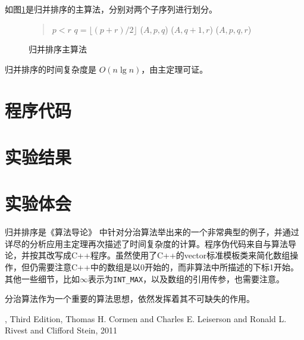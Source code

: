 \documentclass[cs4size,a4paper,nofonts]{ctexart}
\begin{document}
如图\ref{Merge-Sort}是归并排序的主算法，分别对两个子序列进行划分。

\begin{figure}[htp]
\begin{quote}
\begin{codebox}
\li \If $p < r$ \Then
\li   $q = \lfloor (p + r) / 2 \rfloor$
\li   {}($A, p, q$)
\li   {}($A, q + 1, r$)
\li   {}($A, p, q, r$)
    \End
\end{codebox}
\end{quote}
\caption{\label{Merge-Sort}归并排序主算法}
\end{figure}

归并排序的时间复杂度是 $O(n\lg n)$，由主定理可证。

\section{程序代码}
{\linespread{1}}

\section{实验结果}
\begin{quote}

\end{quote}

\section{实验体会}

归并排序是《算法导论》\cite{clrs} 中针对分治算法举出来的一个非常典型的例子，并通过详尽的分析应用主定理再次描述了时间复杂度的计算。程序伪代码来自与算法导论，并按其改写成C++程序。虽然使用了C++的vector标准模板类来简化数组操作，但仍需要注意C++中的数组是以0开始的，而非算法中所描述的下标1开始。其他一些细节，比如$\infty$表示为\verb|INT_MAX|，以及数组的引用传参，也需要注意。

分治算法作为一个重要的算法思想，依然发挥着其不可缺失的作用。

\begin{thebibliography}{10}
, Third Edition, Thomas H. Cormen and Charles E. Leiserson and Ronald L. Rivest and Clifford Stein, 2011
\end{thebibliography}
\end{document}
